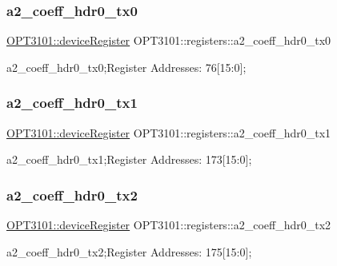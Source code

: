 \subsubsection{\texorpdfstring{a2\+\_\+coeff\+\_\+hdr0\+\_\+tx0}{a2\_coeff\_hdr0\_tx0}}
{\footnotesize\ttfamily \mbox{\hyperlink{class_o_p_t3101_1_1device_register}{O\+P\+T3101\+::device\+Register}} O\+P\+T3101\+::registers\+::a2\+\_\+coeff\+\_\+hdr0\+\_\+tx0}



a2\+\_\+coeff\+\_\+hdr0\+\_\+tx0;Register Addresses\+: 76\mbox{[}15\+:0\mbox{]}; 

\mbox{\label{class_o_p_t3101_1_1registers_a7e97aec69ecbe00c5b35ef15d3abca3c}} 
\subsubsection{\texorpdfstring{a2\+\_\+coeff\+\_\+hdr0\+\_\+tx1}{a2\_coeff\_hdr0\_tx1}}
{\footnotesize\ttfamily \mbox{\hyperlink{class_o_p_t3101_1_1device_register}{O\+P\+T3101\+::device\+Register}} O\+P\+T3101\+::registers\+::a2\+\_\+coeff\+\_\+hdr0\+\_\+tx1}



a2\+\_\+coeff\+\_\+hdr0\+\_\+tx1;Register Addresses\+: 173\mbox{[}15\+:0\mbox{]}; 

\mbox{\label{class_o_p_t3101_1_1registers_a51cd64111761c38c6cf6d842077bd8b0}} 
\subsubsection{\texorpdfstring{a2\+\_\+coeff\+\_\+hdr0\+\_\+tx2}{a2\_coeff\_hdr0\_tx2}}
{\footnotesize\ttfamily \mbox{\hyperlink{class_o_p_t3101_1_1device_register}{O\+P\+T3101\+::device\+Register}} O\+P\+T3101\+::registers\+::a2\+\_\+coeff\+\_\+hdr0\+\_\+tx2}



a2\+\_\+coeff\+\_\+hdr0\+\_\+tx2;Register Addresses\+: 175\mbox{[}15\+:0\mbox{]}; 

